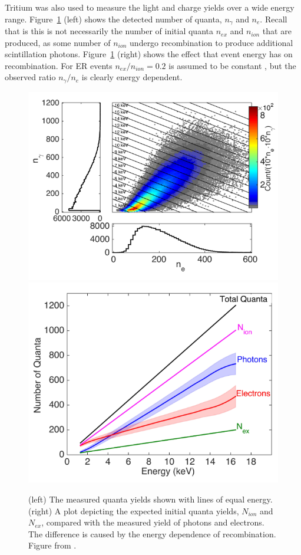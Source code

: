 Tritium was also used to measure the light and charge yields over a wide energy range. Figure~\ref{fig:tritium3} (left) shows the detected number of quanta, $n_{\gamma}$ and $n_{e}$. Recall that is this is not necessarily the number of initial quanta $n_{ex}$ and $n_{ion}$ that are produced, as some number of $n_{ion}$ undergo recombination to produce additional scintillation photons.  Figure~\ref{fig:tritium3} (right) shows the effect that event energy has on recombination. For \ac{ER} events $n_{ex} / n_{ion} = 0.2$ is assumed to be constant \cite{LUX:YieldsAndRecombination}, but the observed ratio $n_{\gamma} / n_{e}$ is clearly energy dependent.

\begin{figure}[htbp]
\begin{center}
\includegraphics[width=\halffig]{figures/lux/lux_tritium3a.png}
\includegraphics[width=\halffig]{figures/lux/lux_tritium3b.png}
\caption{ (left) The measured quanta yields shown with lines of equal energy. (right) A plot depicting the expected initial quanta yields, $N_{ion}$ and $N_{ex}$, compared with the measured yield of photons and electrons. The difference is caused by the energy dependence of recombination. Figure from \cite{LUXTritium}.}
\label{fig:tritium3}
\end{center}
\end{figure}

